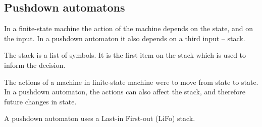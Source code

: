 
\subsection{Pushdown automatons}

In a finite-state machine the action of the machine depends on the state, and on the input. In a pushdown automaton it also depends on a third input – stack.

The stack is a list of symbols. It is the first item on the stack which is used to inform the decision.

The actions of a machine in finite-state machine were to move from state to state. In a pushdown automaton, the actions can also affect the stack, and therefore future changes in state.

A pushdown automaton uses a Last-in First-out (LiFo) stack.

